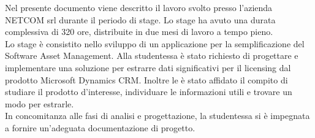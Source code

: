 Nel presente documento viene descritto il lavoro svolto presso l’azienda NETCOM srl durante il periodo di stage.
Lo stage ha avuto una durata complessiva di 320 ore, distribuite in due mesi di lavoro a tempo pieno. \\
Lo stage è consistito nello sviluppo di un applicazione per la semplificazione del Software Asset Management.
Alla studentessa è stato richiesto di progettare e implementare una soluzione per estrarre dati significativi per il licensing dal prodotto Microsoft Dynamics CRM.  Inoltre le è stato affidato il compito di studiare il prodotto d'interesse, individuare le informazioni utili e trovare un modo per estrarle. \\
In concomitanza alle fasi di analisi e progettazione, la studentessa si è impegnata a fornire un'adeguata documentazione di progetto.




